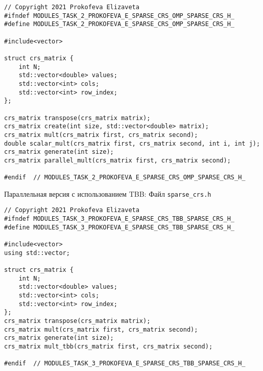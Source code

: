 \documentclass{report}
\begin{document}
\begin{lstlisting}
// Copyright 2021 Prokofeva Elizaveta
#ifndef MODULES_TASK_2_PROKOFEVA_E_SPARSE_CRS_OMP_SPARSE_CRS_H_
#define MODULES_TASK_2_PROKOFEVA_E_SPARSE_CRS_OMP_SPARSE_CRS_H_

#include<vector>

struct crs_matrix {
    int N;
    std::vector<double> values;
    std::vector<int> cols;
    std::vector<int> row_index;
};

crs_matrix transpose(crs_matrix matrix);
crs_matrix create(int size, std::vector<double> matrix);
crs_matrix mult(crs_matrix first, crs_matrix second);
double scalar_mult(crs_matrix first, crs_matrix second, int i, int j);
crs_matrix generate(int size);
crs_matrix parallel_mult(crs_matrix first, crs_matrix second);

#endif  // MODULES_TASK_2_PROKOFEVA_E_SPARSE_CRS_OMP_SPARSE_CRS_H_
\end{lstlisting}
 Параллельная версия с использованием TBB:
\newline Файл \verb|sparse_crs.h|
\begin{lstlisting}
// Copyright 2021 Prokofeva Elizaveta
#ifndef MODULES_TASK_3_PROKOFEVA_E_SPARSE_CRS_TBB_SPARSE_CRS_H_
#define MODULES_TASK_3_PROKOFEVA_E_SPARSE_CRS_TBB_SPARSE_CRS_H_

#include<vector>
using std::vector;

struct crs_matrix {
    int N;
    std::vector<double> values;
    std::vector<int> cols;
    std::vector<int> row_index;
};
crs_matrix transpose(crs_matrix matrix);
crs_matrix mult(crs_matrix first, crs_matrix second);
crs_matrix generate(int size);
crs_matrix mult_tbb(crs_matrix first, crs_matrix second);

#endif  // MODULES_TASK_3_PROKOFEVA_E_SPARSE_CRS_TBB_SPARSE_CRS_H_
\end{lstlisting}
\end{document}
